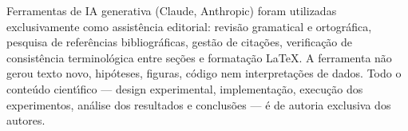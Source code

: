 \documentclass[12pt]{article}
\begin{document}
Ferramentas de IA generativa (Claude, Anthropic) foram utilizadas
exclusivamente como assist\^encia editorial: revis\~ao gramatical e
ortogr\'afica, pesquisa de refer\^encias bibliogr\'aficas, gest\~ao de
cita\c{c}\~oes, verifica\c{c}\~ao de consist\^encia terminol\'ogica entre
se\c{c}\~oes e formata\c{c}\~ao \LaTeX. A ferramenta n\~ao gerou texto
novo, hip\'oteses, figuras, c\'odigo nem interpreta\c{c}\~oes de dados.
Todo o conte\'udo cient\'{\i}fico --- design experimental,
implementa\c{c}\~ao, execu\c{c}\~ao dos experimentos, an\'alise dos
resultados e conclus\~oes --- \'e de autoria exclusiva dos autores.



\end{document}
